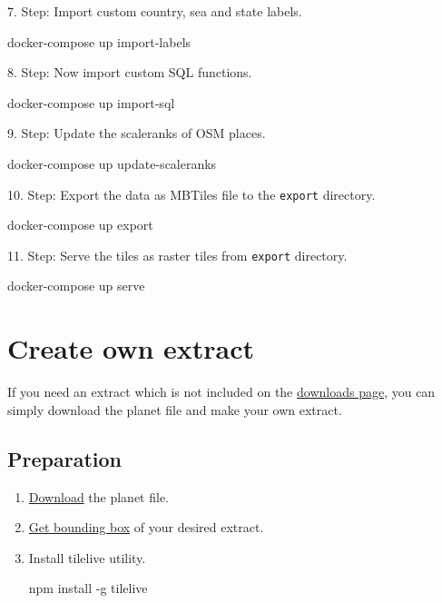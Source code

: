 7. Step: Import custom country, sea and state labels.

\begin{bashcode}
docker-compose up import-labels
\end{bashcode}

8. Step: Now import custom SQL functions.

\begin{bashcode}
docker-compose up import-sql
\end{bashcode}

9. Step: Update the scaleranks of OSM places.

\begin{bashcode}
docker-compose up update-scaleranks
\end{bashcode}

10. Step: Export the data as MBTiles file to the \texttt{export} directory.

\begin{bashcode}
docker-compose up export
\end{bashcode}

11. Step: Serve the tiles as raster tiles from \texttt{export} directory.

\begin{bashcode}
docker-compose up serve
\end{bashcode}



\section{Create own extract}\label{create-own-extract}

If you need an extract which is not included on the
\href{http://osm2vectortiles.org/data/download.html}{downloads page},
you can simply download the planet file and make your own extract.

\subsection{Preparation}\label{preparation}

\begin{enumerate}
\def\labelenumi{\arabic{enumi}.}
\item
  \href{http://osm2vectortiles.org/data/download.html}{Download} the
  planet file.
\item
  \href{http://tools.geofabrik.de/calc/\#type=geofabrik_standard\&bbox=5.538062,47.236312,15.371071,54.954937\&tab=1\&proj=EPSG:4326\&places=2}{Get
  bounding box} of your desired extract.
\item
  Install tilelive utility.

\begin{bashcode}
npm install -g tilelive
\end{bashcode}
\end{enumerate}

